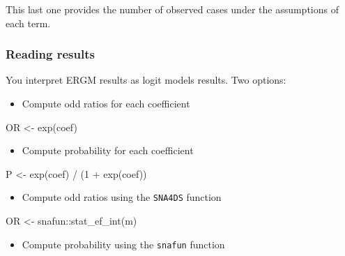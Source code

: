 \documentclass[
]{article}
\newenvironment{Shaded}{\begin{snugshade}}{\end{snugshade}}
\newcommand{\DecValTok}[1]{\textcolor[rgb]{0.00,0.00,0.81}{#1}}
\newcommand{\FunctionTok}[1]{\textcolor[rgb]{0.00,0.00,0.00}{#1}}
\newcommand{\NormalTok}[1]{#1}
\newcommand{\OtherTok}[1]{\textcolor[rgb]{0.56,0.35,0.01}{#1}}
\newcommand{\SpecialCharTok}[1]{\textcolor[rgb]{0.00,0.00,0.00}{#1}}
\providecommand{\tightlist}{%
  \setlength{\itemsep}{0pt}\setlength{\parskip}{0pt}}
\begin{document}
This last one provides the number of observed cases under the
assumptions of each term.

\hypertarget{reading-results}{%
\subsubsection{Reading results}\label{reading-results}}

You interpret ERGM results as logit models results. Two options:

\begin{itemize}
\tightlist
\item
  Compute odd ratios for each coefficient
\end{itemize}

\begin{Shaded}
\begin{Highlighting}[]
\NormalTok{OR }\OtherTok{\textless{}{-}} \FunctionTok{exp}\NormalTok{(coef)}
\end{Highlighting}
\end{Shaded}

\begin{itemize}
\tightlist
\item
  Compute probability for each coefficient
\end{itemize}

\begin{Shaded}
\begin{Highlighting}[]
\NormalTok{P }\OtherTok{\textless{}{-}} \FunctionTok{exp}\NormalTok{(coef) }\SpecialCharTok{/}\NormalTok{ (}\DecValTok{1} \SpecialCharTok{+} \FunctionTok{exp}\NormalTok{(coef))}
\end{Highlighting}
\end{Shaded}

\begin{itemize}
\tightlist
\item
  Compute odd ratios using the \texttt{SNA4DS} function
\end{itemize}

\begin{Shaded}
\begin{Highlighting}[]

\NormalTok{OR }\OtherTok{\textless{}{-}}\NormalTok{ snafun}\SpecialCharTok{::}\FunctionTok{stat\_ef\_int}\NormalTok{(m)}
\end{Highlighting}
\end{Shaded}

\begin{itemize}
\tightlist
\item
  Compute probability using the \texttt{snafun} function
\end{itemize}
\end{document}
